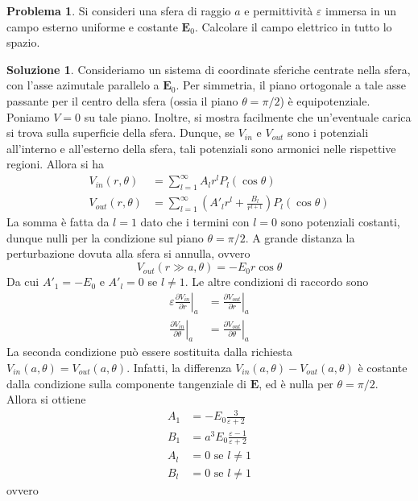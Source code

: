 \documentclass[a4paper,11pt]{book}
\renewcommand{\vec}[1]{\mathbf{#1}}
\theoremstyle{theorem}
\theoremstyle{definition}
\newtheorem{problema}{Problema}[section]
\newtheorem{soluzione}{Soluzione}[section]
\begin{document}
\begin{problema}
	Si consideri una sfera di raggio $a$ e permittività $\varepsilon$ immersa in un campo esterno uniforme e costante $\vec{E}_0$. Calcolare il campo elettrico in tutto lo spazio.
\end{problema}
\begin{soluzione}
	Consideriamo un sistema di coordinate sferiche centrate nella sfera, con l'asse azimutale parallelo a $\vec{E}_0$. Per simmetria, il piano ortogonale a tale asse passante per il centro della sfera (ossia il piano $\theta=\pi/2$) è equipotenziale. Poniamo $V=0$ su tale piano. Inoltre, si mostra facilmente che un'eventuale carica si trova sulla superficie della sfera. Dunque, se $V_{in}$ e $V_{out}$ sono i potenziali all'interno e all'esterno della sfera, tali potenziali sono armonici nelle rispettive regioni. Allora si ha
	\begin{align*}V_{in}(r,\theta)&=\sum_{l=1}^{\infty}A_lr^lP_l(\cos\theta)\\ V_{out}(r,\theta)&=\sum_{l=1}^{\infty}\left(A'_lr^l+\frac{B_l}{r^{l+1}}\right)P_l(\cos\theta)\end{align*}
	La somma è fatta da $l=1$ dato che i termini con $l=0$ sono potenziali costanti, dunque nulli per la condizione sul piano $\theta=\pi/2$. A grande distanza la perturbazione dovuta alla sfera si annulla, ovvero
	\[V_{out}(r\gg a,\theta)=-E_0r\cos\theta\]
	Da cui $A'_1=-E_0$ e $A'_l=0$ se $l\neq 1$. Le altre condizioni di raccordo sono
	\begin{align*}
		\varepsilon\left.\frac{\partial V_{in}}{\partial r}\right|_a&=\left.\frac{\partial V_{out}}{\partial r}\right|_a\\
		\left.\frac{\partial V_{in}}{\partial \theta}\right|_a&=\left.\frac{\partial V_{out}}{\partial \theta}\right|_a
	\end{align*}
	La seconda condizione può essere sostituita dalla richiesta $V_{in}(a,\theta)=V_{out}(a,\theta)$. Infatti, la differenza $V_{in}(a,\theta)-V_{out}(a,\theta)$ è costante dalla condizione sulla componente tangenziale di $\vec{E}$, ed è nulla per $\theta=\pi/2$. Allora si ottiene
	\begin{align*}
		A_1&=-E_0\frac{3}{\varepsilon+2}\\B_1&=a^3E_0\frac{\varepsilon-1}{\varepsilon+2}\\A_l&=0\textrm{ se }l\neq 1\\B_l&=0\textrm{ se }l\neq 1
	\end{align*}
	ovvero
	\begin{align*}

\end{align*}
\end{soluzione}
\end{document}
